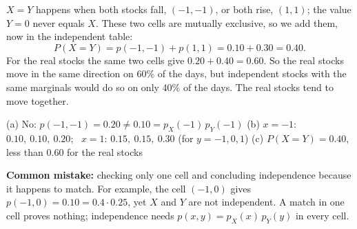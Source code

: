 \begin{solution}
	 $X=Y$ happens when both stocks fall, $(-1,-1)$, or both rise,
	$(1,1)$; the value $Y=0$ never equals $X$. These two cells are mutually
	exclusive, so we add them, now in the independent table:
	\[ P(X=Y)=p(-1,-1)+p(1,1)=0.10+0.30=0.40. \]
	For the real stocks the same two cells give $0.20+0.40=0.60$. So the real
	stocks move in the same direction on 60\% of the days, but independent
	stocks with the same marginals would do so on only 40\% of the days. The
	real stocks tend to move together.
	\begin{answer}
		(a) No: $p(-1,-1)=0.20\neq0.10=p_X(-1)\,p_Y(-1)$
		\quad (b) $x=-1$: $0.10,\ 0.10,\ 0.20$; \ $x=1$: $0.15,\ 0.15,\ 0.30$
		(for $y=-1,0,1$)
		\quad (c) $P(X=Y)=0.40$, less than $0.60$ for the real stocks
	\end{answer}
	\begin{remark}
		\textbf{Common mistake:} checking only one cell and concluding
		independence because it happens to match. For example, the cell
		$(-1,0)$ gives $p(-1,0)=0.10=0.4\cdot0.25$, yet $X$ and $Y$ are not
		independent. A match in one cell proves nothing; independence needs
		$p(x,y)=p_X(x)\,p_Y(y)$ in every cell.
	\end{remark}
\end{solution}
